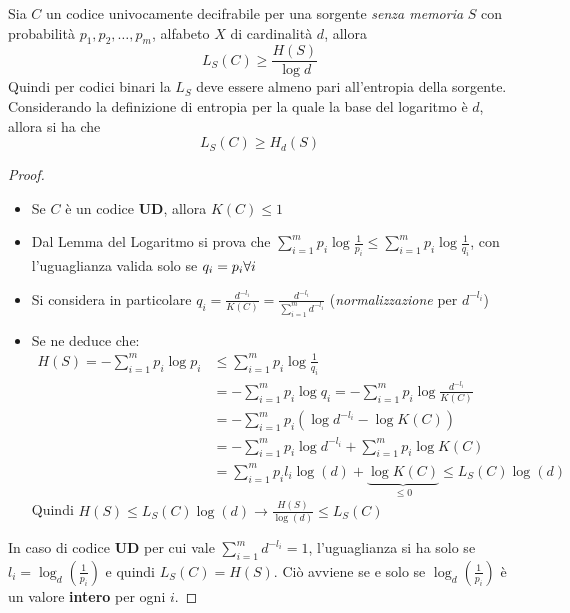 \begin{theorem}
    Sia $C$ un codice univocamente decifrabile per una sorgente \textit{senza memoria} $S$ con probabilità $p_1,p_2,\dots,p_m$, alfabeto $X$ di cardinalità $d$, allora
    \[L_S(C)\geq \frac{H(S)}{\log d}\]
Quindi per codici binari la $L_S$ deve essere almeno pari all'entropia della sorgente.
Considerando la definizione di entropia per la quale la base del logaritmo è $d$, allora si ha che
\[L_S(C) \geq H_d(S)\]
\end{theorem}

\begin{proof}
\begin{itemize}
    \item Se $C$ è un codice \textbf{UD}, allora $K(C) \leq 1$
    \item Dal Lemma del Logaritmo si prova che $\sum_{i=1}^m p_i \log\frac{1}{p_i} \leq \sum_{i=1}^m p_i \log \frac{1}{q_i}$, con l'uguaglianza valida solo se $q_i = p_i \space \forall{i}$
    \item Si considera in particolare $q_i = \frac{d^{-l_i}}{K(C)} = \frac{d^{-l_i}}{\sum_{i=1}^m d^{-l_i}}$ (\textit{normalizzazione} per $d^{-l_i}$)
    \item Se ne deduce che:
\begin{align*}
H(S) = -\sum_{i=1}^m p_i\log p_i &\leq \sum_{i=1}^m p_i\log \frac{1}{q_i} \\
     &= -\sum_{i=1}^m p_i\log q_i = - \sum_{i=1}^m p_i\log\frac{d^{-l_i}}{K(C)} \\
     &= -\sum_{i=1}^m p_i \left( \log d^{-l_i} - \log K(C) \right) \\
     &= - \sum_{i=1}^m p_i \log d^{-l_i} + \sum_{i=1}^m p_i \log K(C) \\
     &= \sum_{i=1}^m p_i l_i \log(d) + \underbrace{\log K(C)}_{\leq 0} \leq L_S(C)\log(d)
\end{align*}
Quindi $H(S) \leq L_S(C)\log(d) \rightarrow \frac{H(S)}{\log(d)} \leq L_S(C)$ 
\end{itemize}

In caso di codice \textbf{UD} per cui vale $\sum_{i=1}^m d^{-l_i} = 1$, l'uguaglianza si ha solo se $l_i = \log_d(\frac{1}{p_i})$ e quindi $L_S(C) = H(S)$. Ciò avviene se e solo se $\log_d(\frac{1}{p_i})$ è un valore \textbf{intero} per ogni $i$.
\end{proof}


